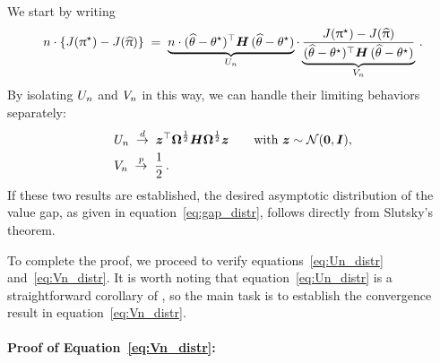 	We start by writing
	\begin{align}
		n \cdot \{ J(\uppi^{\star}) - J(\widehat{\uppi}) \}
		\; = \;  \underbrace{n \cdot (\widehat{\theta} - \theta^{\star})^{\top} \boldsymbol{H} \, (\widehat{\theta} - \theta^{\star})}_{U_{n}}
		\cdot \underbrace{\frac{J(\uppi^{\star}) - J(\widehat{\uppi})}{(\widehat{\theta} - \theta^{\star})^{\top} \boldsymbol{H} \, (\widehat{\theta} - \theta^{\star})}}_{V_{n}} \, .
	\end{align}
	By isolating \(U_{n}\) and \(V_{n}\) in this way, we can handle their limiting behaviors separately:
	\begin{subequations}
	\begin{align}
		& U_{n} \; \stackrel{d}{\rightarrow} \; \boldsymbol{z}^{\top} \boldsymbol{\Omega}^{\frac{1}{2}} \boldsymbol{H} \boldsymbol{\Omega}^{\frac{1}{2}} \boldsymbol{z} \qquad \mbox{with $\boldsymbol{z} \sim \mathcal{N}(\boldsymbol{0}, \boldsymbol{I})$},  \label{eq:Un_distr} \\
		& V_{n} \; \stackrel{p}{\rightarrow} \; \frac{1}{2} \, .  \label{eq:Vn_distr}
	\end{align}
	\end{subequations}
	If these two results are established, the desired asymptotic distribution of the value gap, as given in equation~\eqref{eq:gap_distr}, follows directly from Slutsky’s theorem.
	
	To complete the proof, we proceed to verify equations~\eqref{eq:Un_distr} and~\eqref{eq:Vn_distr}. It is worth noting that equation~\eqref{eq:Un_distr} is a straightforward corollary of , so the main task is to establish the convergence result in equation~\eqref{eq:Vn_distr}.
	
	
	\paragraph{Proof of Equation~\eqref{eq:Vn_distr}:}
	

